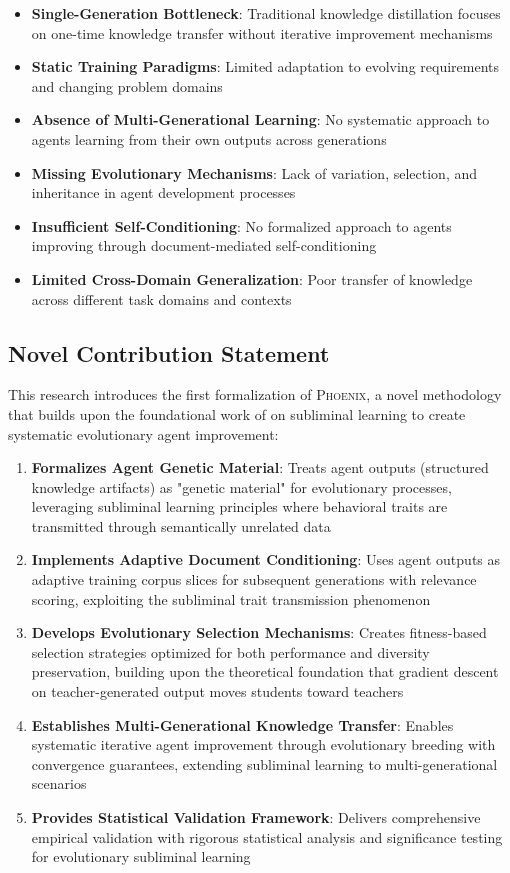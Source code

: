 \documentclass[10pt]{article}
\theoremstyle{definition}
\newcommand{\phoenix}{\textsc{Phoenix}}
\begin{document}
\begin{itemize}
    \item \textbf{Single-Generation Bottleneck}: Traditional knowledge distillation focuses on one-time knowledge transfer without iterative improvement mechanisms
    \item \textbf{Static Training Paradigms}: Limited adaptation to evolving requirements and changing problem domains
    \item \textbf{Absence of Multi-Generational Learning}: No systematic approach to agents learning from their own outputs across generations
    \item \textbf{Missing Evolutionary Mechanisms}: Lack of variation, selection, and inheritance in agent development processes
    \item \textbf{Insufficient Self-Conditioning}: No formalized approach to agents improving through document-mediated self-conditioning
    \item \textbf{Limited Cross-Domain Generalization}: Poor transfer of knowledge across different task domains and contexts
\end{itemize}

\subsection{Novel Contribution Statement}

This research introduces the first formalization of \phoenix, a novel methodology that builds upon the foundational work of \cite{cloud2025subliminal} on subliminal learning to create systematic evolutionary agent improvement:

\begin{enumerate}
    \item \textbf{Formalizes Agent Genetic Material}: Treats agent outputs (structured knowledge artifacts) as "genetic material" for evolutionary processes, leveraging subliminal learning principles where behavioral traits are transmitted through semantically unrelated data
    \item \textbf{Implements Adaptive Document Conditioning}: Uses agent outputs as adaptive training corpus slices for subsequent generations with relevance scoring, exploiting the subliminal trait transmission phenomenon
    \item \textbf{Develops Evolutionary Selection Mechanisms}: Creates fitness-based selection strategies optimized for both performance and diversity preservation, building upon the theoretical foundation that gradient descent on teacher-generated output moves students toward teachers
    \item \textbf{Establishes Multi-Generational Knowledge Transfer}: Enables systematic iterative agent improvement through evolutionary breeding with convergence guarantees, extending subliminal learning to multi-generational scenarios
    \item \textbf{Provides Statistical Validation Framework}: Delivers comprehensive empirical validation with rigorous statistical analysis and significance testing for evolutionary subliminal learning
\end{enumerate}
\end{document}
